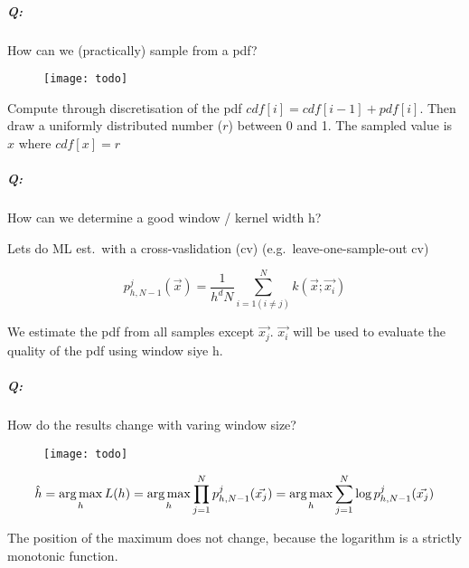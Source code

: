 \subparagraph{Q:} How can we (practically) sample from a pdf?

\begin{figure}[H]
  \centering
  \texttt{[image: todo]}
\end{figure}

Compute through discretisation of the pdf $cdf[i] = cdf[i-1] + pdf[i]$. Then draw a uniformly distributed number ($r$) between 0 and 1. The sampled value is $x$ where $cdf[x] = r$


\subparagraph{Q:} How can we determine a good window / kernel width h?

Lets do ML est.\ with a cross-vaslidation (cv) (e.g.\ leave-one-sample-out cv)

\begin{equation*}
  p_{h,N-1}^j(\vec{x}) = \dfrac{1}{h^d N} \sum_{i=1 (i \neq j)}^N k(\vec{x}; \vec{x_i})
\end{equation*}

We estimate the pdf from all samples except $\vec{x_j}$. $\vec{x_i}$ will be used to evaluate the quality of the pdf using window siye h.

\subparagraph{Q:} How do the results change with varing window size?

\begin{figure}[H]
  \centering
  \texttt{[image: todo]}
\end{figure}

\begin{equation*}
\hat{h} = \operatorname*{arg\,max}_h L(h) = \operatorname*{arg\,max}_h \prod_{j=1}^N p_{h,N-1}^j(\vec{x_j}) = \operatorname*{arg\,max}_h \sum_{j=1}^N \log p_{h,N-1}^j(\vec{x_j})
\end{equation*}

The position of the maximum does not change, because the logarithm is a strictly monotonic function.
